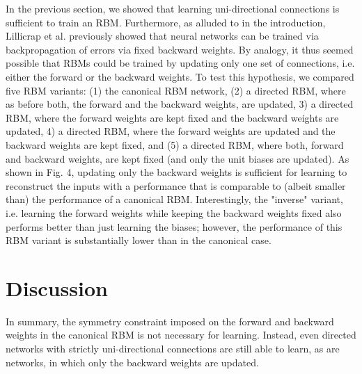 \documentclass[11pt]{article}
\begin{document}
In the previous section, we showed that learning uni-directional
connections is sufficient to train an RBM. Furthermore, as alluded to
in the introduction, Lillicrap et al. previously showed that neural
networks can be trained via backpropagation of errors via fixed
backward weights. By analogy, it thus seemed possible that RBMs could
be trained by updating only one set of connections, i.e. either the
forward or the backward weights. To test this hypothesis, we compared
five RBM variants: (1) the canonical RBM network, (2) a directed RBM,
where as before both, the forward and the backward weights, are
updated, 3) a directed RBM, where the forward weights are kept fixed
and the backward weights are updated, 4) a directed RBM, where the
forward weights are updated and the backward weights are kept fixed,
and (5) a directed RBM, where both, forward and backward weights, are
kept fixed (and only the unit biases are updated). As shown in Fig. 4,
updating only the backward weights is sufficient for learning to
reconstruct the inputs with a performance that is comparable to
(albeit smaller than) the performance of a canonical
RBM. Interestingly, the "inverse" variant, i.e. learning the forward
weights while keeping the backward weights fixed also performs better
than just learning the biases; however, the performance of this RBM
variant is substantially lower than in the canonical case.



\section{Discussion}

In summary, the symmetry constraint imposed on the forward and
backward weights in the canonical RBM is not necessary for
learning. Instead, even directed networks with strictly
uni-directional connections are still able to learn, as are networks,
in which only the backward weights are updated.
\end{document}
